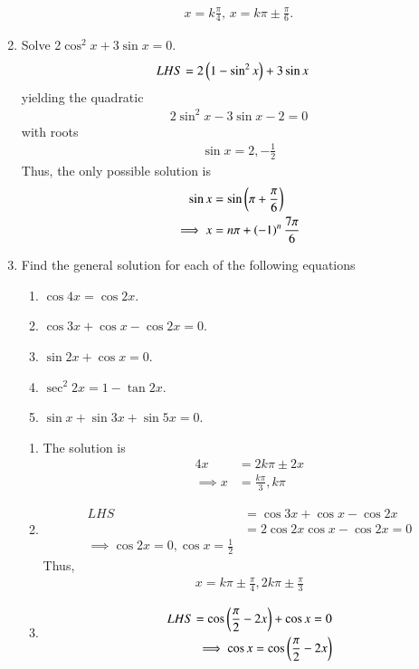 \begin{enumerate}[label=\thesubsection.\arabic*,ref=\thesubsection.\theenumi]
\begin{align}
	x = k \frac{\pi}{4},\,
	x = k\pi \pm \frac{\pi}{6}.
\end{align}
%
\item Solve 2$\cos^{2}x+3\sin x=0$.
	\\
	\solution
\begin{align}
	LHS &= 2\left(1-\sin^2x\right)+3\sin x
\end{align}
%
yielding the quadratic
\begin{align}
	 2\sin^2x-3\sin x -2= 0
\end{align}
with roots
\begin{align}
	\sin x = 2, -\frac{1}{2}
\end{align}
Thus, the only possible solution is
\begin{align}
	\sin x &= \sin \left(\pi + \frac{\pi}{6}\right)
\\
	\implies x &= n\pi + \left(-1\right)^n\frac{7\pi}{6}
\end{align}
\item Find the general solution for each of the following equations
\begin{enumerate}
\item $\cos4x=\cos2x$.
\item $\cos3x+\cos x-\cos2x=0$.
\item $\sin2x+\cos x=0$.
\item $\sec^{2}2x=1-\tan2x$.
\item $\sin x+\sin3x+\sin5x=0$.
\end{enumerate}
%
\solution
\begin{enumerate}
\item The solution is
\begin{align}
	4x &= 2k\pi \pm 2x
	\\
	\implies x &= \frac{k\pi}{3}, k\pi
\end{align}
\item 
\begin{align}
	LHS &=\cos3x+\cos x-\cos2x
	\\
	&=2\cos2x\cos x-\cos2x=0
	\\
	\implies \cos 2x= 0, \cos x = \frac{1}{2}
\end{align}
Thus, 
\begin{align}
	x = k\pi \pm \frac{\pi}{4}, 2k\pi \pm \frac{\pi}{3}
\end{align}
\item 
\begin{align}
	LHS = \cos\brak{\frac{\pi}{2}-2x}+\cos x = 0
	\\
	\implies 
\cos x =	 \cos\brak{\frac{\pi}{2}-2x} 
	 \\

\end{align}
\end{enumerate}
\end{enumerate}
